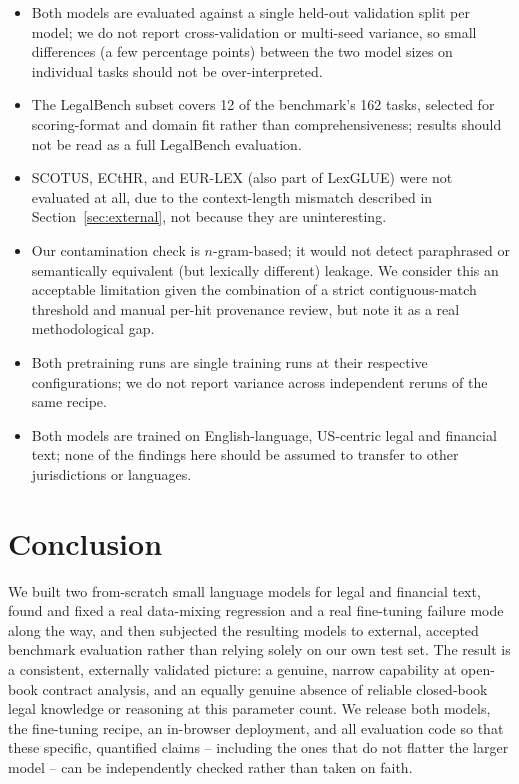 \documentclass[11pt]{article}
\begin{document}
\begin{itemize}[nosep]
  \item Both models are evaluated against a single held-out validation
    split per model; we do not report cross-validation or multi-seed
    variance, so small differences (a few percentage points) between the
    two model sizes on individual tasks should not be over-interpreted.
  \item The LegalBench subset covers 12 of the benchmark's 162 tasks,
    selected for scoring-format and domain fit rather than
    comprehensiveness; results should not be read as a full LegalBench
    evaluation.
  \item SCOTUS, ECtHR, and EUR-LEX (also part of LexGLUE) were not
    evaluated at all, due to the context-length mismatch described in
    Section~\ref{sec:external}, not because they are uninteresting.
  \item Our contamination check is $n$-gram-based; it would not detect
    paraphrased or semantically equivalent (but lexically different)
    leakage. We consider this an acceptable limitation given the
    combination of a strict contiguous-match threshold and manual
    per-hit provenance review, but note it as a real methodological gap.
  \item Both pretraining runs are single training runs at their
    respective configurations; we do not report variance across
    independent reruns of the same recipe.
  \item Both models are trained on English-language, US-centric legal and
    financial text; none of the findings here should be assumed to
    transfer to other jurisdictions or languages.
\end{itemize}

\section{Conclusion}

We built two from-scratch small language models for legal and financial
text, found and fixed a real data-mixing regression and a real
fine-tuning failure mode along the way, and then subjected the resulting
models to external, accepted benchmark evaluation rather than relying
solely on our own test set. The result is a consistent, externally
validated picture: a genuine, narrow capability at open-book contract
analysis, and an equally genuine absence of reliable closed-book legal
knowledge or reasoning at this parameter count. We release both models,
the fine-tuning recipe, an in-browser deployment, and all evaluation code
so that these specific, quantified claims -- including the ones that do
not flatter the larger model -- can be independently checked rather than
taken on faith.
\end{document}
